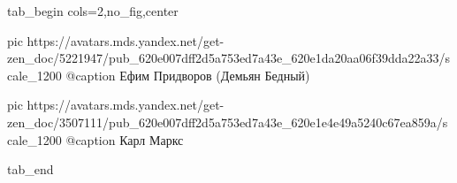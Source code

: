  
 
 
 
 


\ifcmt
  tab_begin cols=2,no_fig,center

     pic https://avatars.mds.yandex.net/get-zen_doc/5221947/pub_620e007dff2d5a753ed7a43e_620e1da20aa06f39dda22a33/scale_1200
		 @caption Ефим Придворов (Демьян Бедный)

		 pic https://avatars.mds.yandex.net/get-zen_doc/3507111/pub_620e007dff2d5a753ed7a43e_620e1e4e49a5240c67ea859a/scale_1200
		 @caption Карл Маркс

  tab_end
\fi
